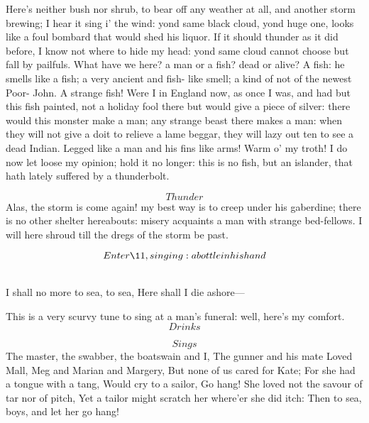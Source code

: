 \documentclass[11pt]{book}
\begin{document}
\begin{PROSE}

	Here's neither bush nor shrub, to bear off
	any weather at all, and another storm brewing;
	I hear it sing i' the wind: yond same black
	cloud, yond huge one, looks like a foul
	bombard that would shed his liquor. If it
	should thunder as it did before, I know not
	where to hide my head: yond same cloud cannot
	choose but fall by pailfuls. What have we
	here? a man or a fish? dead or alive? A fish:
	he smells like a fish; a very ancient and fish-
	like smell; a kind of not of the newest Poor-
	John. A strange fish! Were I in England now,
	as once I was, and had but this fish painted,
	not a holiday fool there but would give a piece
	of silver: there would this monster make a
	man; any strange beast there makes a man:
	when they will not give a doit to relieve a lame
	beggar, they will lazy out ten to see a dead
	Indian. Legged like a man and his fins like
	arms! Warm o' my troth! I do now let loose
	my opinion; hold it no longer: this is no fish,
	but an islander, that hath lately suffered by a
	thunderbolt.

	\[Thunder\]
	Alas, the storm is come again! my best way is to
	creep under his gaberdine; there is no other
	shelter hereabouts: misery acquaints a man with
	strange bed-fellows. I will here shroud till the
	dregs of the storm be past.

	\[Enter \11, singing: a bottle in his hand\]

\end{PROSE}

 \\
{   \Forma {} \Locus \textus {+5em}
   I shall no more to sea, to sea,
	Here shall I die ashore---
}

\begin{PROSE}

	This is a very scurvy tune to sing at a man's
	funeral: well, here's my comfort. \[Drinks\]

\end{PROSE}

	\[Sings\]
{  \Forma {}
   \Locus \textus {+3em}
	The master, the swabber, the boatswain and I,
	The gunner and his mate
	Loved Mall, Meg and Marian and Margery,
	But none of us cared for Kate;
	For she had a tongue with a tang,
	Would cry to a sailor, Go hang!
	She loved not the savour of tar nor of pitch,
	Yet a tailor might scratch her where'er she did itch:
	Then to sea, boys, and let her go hang!
}
\end{document}
